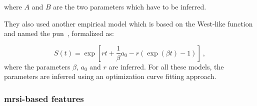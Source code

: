 \begin{enumerate}[leftmargin=*]
\noindent where $A$ and $B$ are the two parameters which have to be inferred.

They also used another empirical model which is based on the West-like function
and named the \ac{pun}~\cite{Castorina2006}, formalized as:

\begin{equation}
  S(t) = \exp \left[ r t + \frac{1}{\beta} a_0 - r \left( \exp( \beta t ) - 1
    \right) \right] \ ,
  \label{eq:pun}
\end{equation}
\noindent where the parameters $\beta$, $a_0$ and $r$ are inferred.
For all these models, the parameters are inferred using an optimization curve
fitting approach.

\end{enumerate}

\subsubsection{\acs*{mrsi}-based features}\label{subsubsec:chp3:img-clas:CADX-fea-dec:MRSI-fea}

